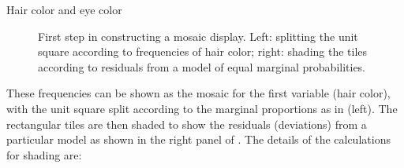 \documentclass[10pt,krantz2]{krantz}\usepackage[]{graphicx}\usepackage[]{color}
\newenvironment{knitrout}{}{} %
\renewenvironment{knitrout}{\small\renewcommand{\baselinestretch}{.85}}{} %
\begin{document}
\begin{Example}[haireye2a]{Hair color and eye color}
\begin{knitrout}
\begin{figure}[!htbp]
\caption[First step in constructing a mosaic display]{First step in constructing a mosaic display. Left: splitting the unit square according to frequencies of hair color; right: shading the tiles according to residuals from a model of equal marginal probabilities.\label{fig:haireye-mos4}}
\end{figure}


\end{knitrout}

These frequencies can be shown as the mosaic for the first variable (hair color),
with the unit square split according to the marginal proportions
as in  (left).
The rectangular tiles are then shaded to show the residuals (deviations)
from a particular model as shown in the right panel of .
The details of the calculations for shading are:


\end{Example}
\end{document}
